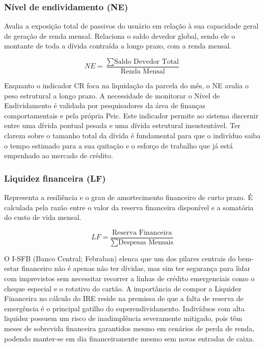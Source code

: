 \documentclass[portuguese]{sbc2025}%
\begin{document}
\subsubsection{Nível de endividamento (NE)}

Avalia a exposição total de passivos do usuário em relação à sua capacidade geral de geração de renda mensal. Relaciona o saldo devedor global, sendo ele o montante de toda a dívida contraída a longo prazo, com a renda mensal.

\begin{equation}\label{equ2}
    NE = \frac{\sum \text{Saldo Devedor Total}}{\text{Renda Mensal}}
\end{equation}

Enquanto o indicador CR foca na liquidação da parcela do mês, o NE avalia o peso estrutural a longo prazo. A necessidade de monitorar o Nível de Endividamento é validada por pesquisadores da área de finanças comportamentais e pela própria Peic. Este indicador permite ao sistema discernir entre uma dívida pontual pesada e uma dívida estrutural insustentável. Ter clareza sobre o tamanho total da dívida é fundamental para que o indivíduo saiba o tempo estimado para a sua quitação e o esforço de trabalho que já está empenhado ao mercado de crédito.

\subsubsection{Liquidez financeira (LF)}

Representa a resiliência e o grau de amortecimento financeiro de curto prazo. É calculada pela razão entre o valor da reserva financeira disponível e a somatória do custo de vida mensal.

\begin{equation}\label{equ3}
    LF = \frac{\text{Reserva Financeira}}{\sum \text{Despesas Mensais}}
\end{equation}

O I-SFB (Banco Central; Febraban) elenca que um dos pilares centrais do bem-estar financeiro não é apenas não ter dívidas, mas sim ter segurança para lidar com imprevistos sem necessitar recorrer a linhas de crédito emergenciais como o cheque especial e o rotativo do cartão. A importância de compor a Liquidez Financeira no cálculo do IRE reside na premissa de que a falta de reserva de emergência é o principal gatilho do superendividamento. Indivíduos com alta liquidez possuem um risco de inadimplência severamente mitigado, pois têm meses de sobrevida financeira garantidos mesmo em cenários de perda de renda, podendo manter-se em dia financeiramente mesmo sem novas entradas de caixa.
\end{document}

